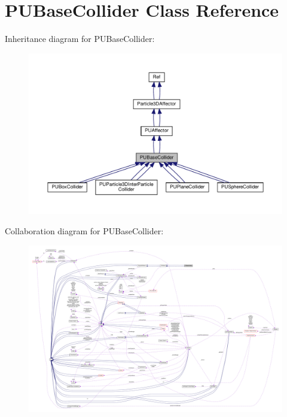 \hypertarget{classPUBaseCollider}{}\section{P\+U\+Base\+Collider Class Reference}
\label{classPUBaseCollider}


Inheritance diagram for P\+U\+Base\+Collider\+:
\nopagebreak
\begin{figure}[H]
\begin{center}
\leavevmode
\includegraphics[width=350pt]{classPUBaseCollider__inherit__graph}
\end{center}
\end{figure}


Collaboration diagram for P\+U\+Base\+Collider\+:
\nopagebreak
\begin{figure}[H]
\begin{center}
\leavevmode
\includegraphics[width=350pt]{classPUBaseCollider__coll__graph}
\end{center}
\end{figure}
